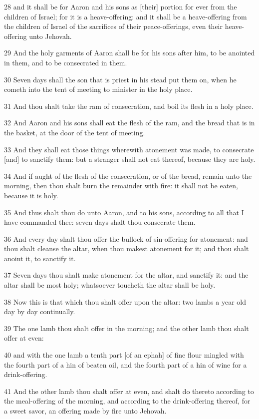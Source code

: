 \par 28 and it shall be for Aaron and his sons as [their] portion for ever from the children of Israel; for it is a heave-offering: and it shall be a heave-offering from the children of Israel of the sacrifices of their peace-offerings, even their heave-offering unto Jehovah.
\par 29 And the holy garments of Aaron shall be for his sons after him, to be anointed in them, and to be consecrated in them.
\par 30 Seven days shall the son that is priest in his stead put them on, when he cometh into the tent of meeting to minister in the holy place.
\par 31 And thou shalt take the ram of consecration, and boil its flesh in a holy place.
\par 32 And Aaron and his sons shall eat the flesh of the ram, and the bread that is in the basket, at the door of the tent of meeting.
\par 33 And they shall eat those things wherewith atonement was made, to consecrate [and] to sanctify them: but a stranger shall not eat thereof, because they are holy.
\par 34 And if aught of the flesh of the consecration, or of the bread, remain unto the morning, then thou shalt burn the remainder with fire: it shall not be eaten, because it is holy.
\par 35 And thus shalt thou do unto Aaron, and to his sons, according to all that I have commanded thee: seven days shalt thou consecrate them.
\par 36 And every day shalt thou offer the bullock of sin-offering for atonement: and thou shalt cleanse the altar, when thou makest atonement for it; and thou shalt anoint it, to sanctify it.
\par 37 Seven days thou shalt make atonement for the altar, and sanctify it: and the altar shall be most holy; whatsoever toucheth the altar shall be holy.
\par 38 Now this is that which thou shalt offer upon the altar: two lambs a year old day by day continually.
\par 39 The one lamb thou shalt offer in the morning; and the other lamb thou shalt offer at even:
\par 40 and with the one lamb a tenth part [of an ephah] of fine flour mingled with the fourth part of a hin of beaten oil, and the fourth part of a hin of wine for a drink-offering.
\par 41 And the other lamb thou shalt offer at even, and shalt do thereto according to the meal-offering of the morning, and according to the drink-offering thereof, for a sweet savor, an offering made by fire unto Jehovah.
